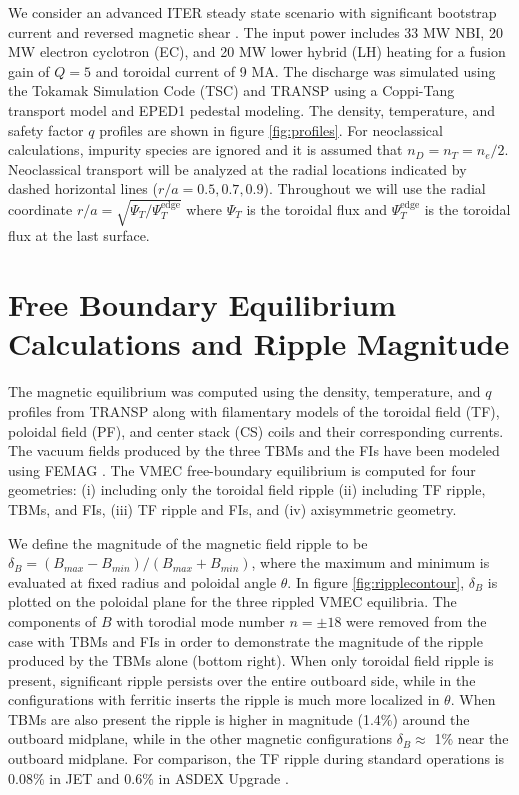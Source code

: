 \documentclass{article}
\numberwithin{figure}{section}
\numberwithin{equation}{section}
\begin{document}
We consider an advanced ITER steady state scenario with significant bootstrap current and reversed magnetic shear \cite{Poli2014}. The input power includes 33 MW NBI, 20 MW electron cyclotron (EC), and 20 MW lower hybrid (LH) heating for a fusion gain of $Q = 5$ and toroidal current of 9 MA. The discharge was simulated using the Tokamak Simulation Code (TSC) \cite{Jardin1986} and TRANSP \cite{Hawryluk1980} using a Coppi-Tang \cite{Jardin1993} transport model and EPED1 \cite{Snyder2011} pedestal modeling. The density, temperature, and safety factor $q$ profiles are shown in figure \ref{fig:profiles}. For neoclassical calculations, impurity species are ignored and it is assumed that $n_D = n_T = n_e/2$. Neoclassical transport will be analyzed at the radial locations indicated by dashed horizontal lines ($r/a = 0.5, 0.7, 0.9$). Throughout we will use the radial coordinate $r/a = \sqrt{\Psi_T/\Psi_T^{\text{edge}}}$ where $\Psi_T$ is the toroidal flux and $\Psi_T^{\text{edge}}$ is the toroidal flux at the last surface.

\FloatBarrier

\section{Free Boundary Equilibrium Calculations and Ripple Magnitude} \label{vmec}

The magnetic equilibrium was computed using the density, temperature, and $q$ profiles from TRANSP along with filamentary models of the toroidal field (TF), poloidal field (PF), and center stack (CS) coils and their corresponding currents. The vacuum fields produced by the three TBMs and the FIs have been modeled using FEMAG \cite{Shinohara2009}. The VMEC free-boundary equilibrium \cite{Hirshman1986} is computed for four geometries: (i) including only the toroidal field ripple (ii) including TF ripple, TBMs, and FIs, (iii) TF ripple and FIs, and (iv) axisymmetric geometry.  

We define the magnitude of the magnetic field ripple to be $\delta_B = (B_{max}-B_{min})/(B_{max} + B_{min})$, where the maximum and minimum is evaluated at fixed radius and poloidal angle $\theta$. In figure \ref{fig:ripplecontour}, $\delta_B$ is plotted on the poloidal plane for the three rippled VMEC equilibria. The components of $B$ with torodial mode number $n = \pm 18$ were removed from the case with TBMs and FIs in order to demonstrate the magnitude of the ripple produced by the TBMs alone (bottom right). When only toroidal field ripple is present, significant ripple persists over the entire outboard side, while in the configurations with ferritic inserts the ripple is much more localized in $\theta$. When TBMs are also present the ripple is higher in magnitude (1.4\%) around the outboard midplane, while in the other magnetic configurations $\delta_B \approx$ 1\% near the outboard midplane. For comparison, the TF ripple during standard operations is $0.08\%$ in JET \cite{DeVries2008} and $0.6\%$ in ASDEX Upgrade \cite{Martitsch2016}. 
\end{document}
